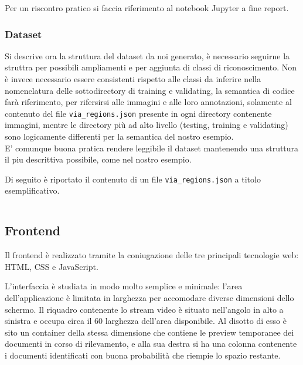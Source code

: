 \documentclass[12pt,a4paper]{article}
\begin{document}
Per un riscontro pratico si faccia riferimento al notebook Jupyter a
fine report.

\subsubsection{Dataset}

Si descrive ora la struttura del dataset da noi generato, è necessario
seguirne la struttra per possibili ampliamenti e per aggiunta di classi
di riconoscimento. Non è invece necessario essere consistenti rispetto
alle classi da inferire nella nomenclatura delle sottodirectory di
training e validating, la semantica di codice farà riferimento, per
rifersirsi alle immagini e alle loro annotazioni, solamente al contenuto
del file \texttt{via\_regions.json} presente in ogni directory
contenente immagini, mentre le directory più ad alto livello (testing,
training e validating) sono logicamente differenti per la semantica del
nostro esempio.\\
E' comunque buona pratica rendere leggibile il dataset mantenendo una
struttura il piu descrittiva possibile, come nel nostro esempio.


Di seguito è riportato il contenuto di un file
\texttt{via\_regions.json} a titolo esemplificativo.

\inputminted{json}{via_regions.json}

\subsection{Frontend}

Il frontend è realizzato tramite la coniugazione delle tre principali
tecnologie web: HTML, CSS e JavaScript.

L'interfaccia è studiata in modo molto semplice e minimale: l'area
dell'applicazione è limitata in larghezza per accomodare diverse
dimensioni dello schermo. Il riquadro contenente lo stream video è
situato nell'angolo in alto a sinistra e occupa circa il 60%
larghezza dell'area disponibile. Al disotto di esso è sito un container
della stessa dimensione che contiene le preview temporanee dei documenti
in corso di rilevamento, e alla sua destra si ha una colonna contenente
i documenti identificati con buona probabilità che riempie lo spazio
restante.
\end{document}
